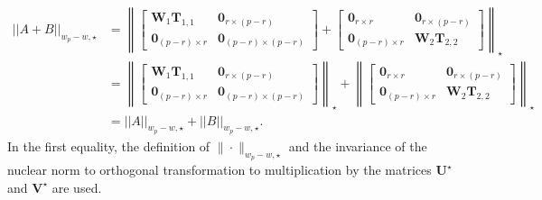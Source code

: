 \documentclass[alpha-refs]{wiley-article}
\begin{document}
\begin{align*}
    ||A+B||_{w_{p} - w, \star}
    &= \left\| \begin{bmatrix}
        \boldsymbol{W}_{1}\boldsymbol{T}_{1,1} & \boldsymbol{0}_{r\times (p-r)} \\
        \boldsymbol{0}_{(p-r) \times r} & \boldsymbol{0}_{(p-r) \times (p-r)}
    \end{bmatrix} +
    \begin{bmatrix}
        \boldsymbol{0}_{r \times r} & \boldsymbol{0}_{r\times (p-r)} \\
        \boldsymbol{0}_{(p-r) \times r} & \boldsymbol{W}_{2}\boldsymbol{T}_{2,2}
    \end{bmatrix}
    \right\|_{\star}\\
    &= \left\| \begin{bmatrix}
        \boldsymbol{W}_{1}\boldsymbol{T}_{1,1} & \boldsymbol{0}_{r\times (p-r)} \\
        \boldsymbol{0}_{(p-r) \times r} & \boldsymbol{0}_{(p-r) \times (p-r)}
    \end{bmatrix}  \right\|_{\star}
    + \left\|\begin{bmatrix}
        \boldsymbol{0}_{r \times r} & \boldsymbol{0}_{r\times (p-r)} \\
        \boldsymbol{0}_{(p-r) \times r} & \boldsymbol{W}_{2}\boldsymbol{T}_{2,2}
    \end{bmatrix}\right\|_{\star} \\
    &= ||A||_{w_{p} - w, \star}+||B||_{w_{p} - w, \star}.
\end{align*}
In the first equality, the definition of $\|\cdot\|_{w_{p} - w, \star}$ and the invariance of the nuclear norm to orthogonal transformation to multiplication by the matrices $\boldsymbol{U}^{\star}$ and $\boldsymbol{V}^{\star}$ are used.
\end{document}
